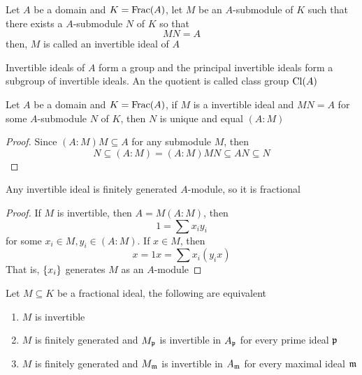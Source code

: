 \begin{definition}
	Let $A$ be a domain and $K = \operatorname{Frac}(A)$, let $M$ be an $A$-submodule of $K$ such that there exists a $A$-submodule $N$ of $K$ so that
	$$
		MN = A
	$$
	then, $M$ is called an invertible ideal of $A$
\end{definition}

\begin{remark}
	Invertible ideals of $A$ form a group and the principal invertible ideals form a subgroup of invertible ideals. An the quotient is called class group $\operatorname{Cl}(A)$
\end{remark}

\begin{proposition}
	Let $A$ be a domain and $K = \operatorname{Frac}(A)$, if $M$ is a invertible ideal and $MN = A$ for some $A$-submodule $N$ of $K$, then $N$ is unique and equal $(A : M)$
\end{proposition}

\begin{proof}
	Since $(A: M) M \subseteq A$ for any submodule $M$, then
	$$
		N \subseteq (A:M) = (A : M) M N \subseteq AN \subseteq N
	$$
\end{proof}

\begin{proposition}
	Any invertible ideal is finitely generated $A$-module, so it is fractional
\end{proposition}

\begin{proof}
	If $M$ is invertible, then $A = M (A : M)$, then
	$$
		1 = \sum x_i y_i
	$$
	for some $x_i \in M, y_i \in (A:M)$. If $x \in M$, then 
	$$
		x = 1 x = \sum x_i (y_i x)
	$$
	That is, $\{x_i\}$ generates $M$ as an $A$-module
\end{proof}

\begin{proposition}
	Let $M \subseteq K$ be a fractional ideal, the following are equivalent
	\begin{enumerate}
		\item $M$ is invertible
		\item $M$ is finitely generated and $M_{\mathfrak{p}}$ is invertible in $A_{\mathfrak{p}}$ for every prime ideal $\mathfrak{p}$
		\item $M$ is finitely generated and $M_{\mathfrak{m}}$ is invertible in $A_{\mathfrak{m}}$ for every maximal ideal $\mathfrak{m}$
	\end{enumerate}
	
\end{proposition}

